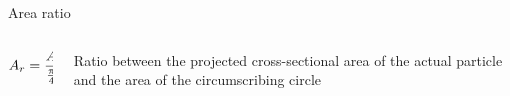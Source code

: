 \documentclass[11pt]{beamer}
\begin{document}
	\begin{frame}
		\begin{block}{Area ratio}
			\begin{columns}[T]
				\begin{column}{.4\textwidth}
					\begin{equation*}
					A_r = \dfrac{A_{\textup{p}, \perp}}{\frac{\pi}{4}\ d_{\textup{c}}^2}
					\end{equation*}	
				\end{column}
				
				\begin{column}{.6\textwidth}
					Ratio between the projected cross-sectional area of the actual particle and the area of the circumscribing circle
				\end{column}
			\end{columns}
		\end{block}
	\end{frame}


%
%
\end{document}
